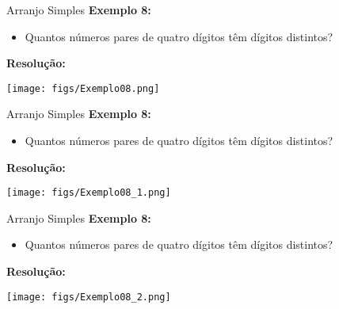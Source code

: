 \documentclass[aspectratio=169]{beamer}
\begin{document}
\begin{frame}{Arranjo Simples}
    \textbf{Exemplo 8:}

    \begin{itemize}
        \item[] Quantos números pares de quatro dígitos têm dígitos distintos?
    \end{itemize}

    \vspace{2mm}
    \pause
    \textbf{Resolução:}
    
   \begin{center}
            \texttt{[image: figs/Exemplo08.png]}
    \end{center}

\end{frame}

\begin{frame}{Arranjo Simples}
    \textbf{Exemplo 8:}

    \begin{itemize}
        \item[] Quantos números pares de quatro dígitos têm dígitos distintos?
    \end{itemize}

    \vspace{2mm}
    
    \textbf{Resolução:}
    
   \begin{center}
            \texttt{[image: figs/Exemplo08\_1.png]}
    \end{center}

\end{frame}

\begin{frame}{Arranjo Simples}
    \textbf{Exemplo 8:}

    \begin{itemize}
        \item[] Quantos números pares de quatro dígitos têm dígitos distintos?
    \end{itemize}

    \vspace{2mm}
    
    \textbf{Resolução:}
    
   \begin{center}
            \texttt{[image: figs/Exemplo08\_2.png]}
    \end{center}
\end{frame}
\end{document}
